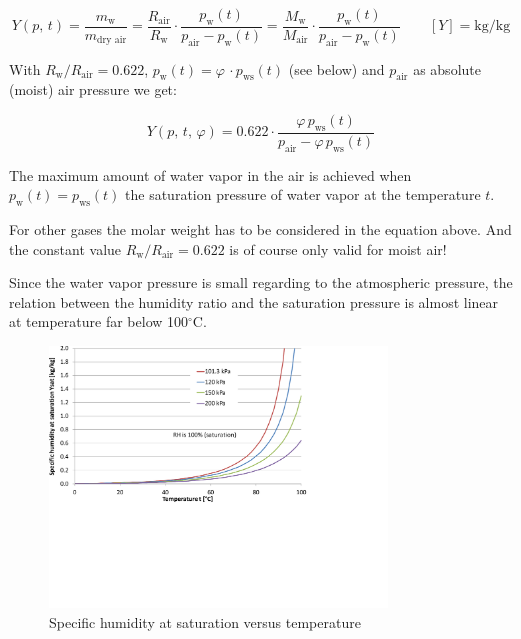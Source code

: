 \documentclass[11pt,a4paper,english,twoside]{scrreprt}
\newcommand{\gradC}{${}^\circ$C}      %
\begin{document}
\begin{equation}
  \label{eqn:Y}
  Y(p,\,t)=\frac{m_\text{w}}{m_\text{dry air}} =\frac{R_\text{air} }{R_\text{w} } \cdot \frac{p_\text{w}(t)}{p_\text{air} - p_\text{w}(t)} 
  =\frac{M_\text{w}}{M_\text{air}} \cdot \frac{p_\text{w}(t)}{p_\text{air} - p_\text{w}(t)}  \qquad [Y]= \si{\kilo\gram\per\kilo\gram}
\end{equation}

With $R_\text{w} / R_\text{air} = 0.622$, $p_\text{w}(t) = \varphi\,\cdot p_\text{ws}(t)$ (see below) and $p_\text{air}$ as absolute (moist) air pressure we get:

\begin{equation}
  \label{eqn:Yphi}
  Y(p,\,t,\,\varphi) = 0.622 \cdot \frac{\varphi\, p_\text{ws}(t) }{p_\text{air} - \varphi\, p_\text{ws}(t)}
\end{equation}


The maximum amount of water vapor in the air is achieved when $p_\text{w}(t) =p_\text{ws}(t)$ the saturation pressure of water vapor at the temperature $t$.

For other gases the molar weight has to be considered in the equation above. And the constant value $R_\text{w} / R_\text{air} = 0.622$ is of course only valid for moist air!

Since the water vapor pressure is small regarding to the atmospheric pressure, the relation between the humidity ratio and the saturation pressure is almost linear at temperature far below 100\gradC.

\begin{figure}
  \centering
  \includegraphics*[width=0.8\textwidth,angle=0]{FCF_Diag_Y.pdf}
  \caption[Specific humidity at saturation versus temperature]{Specific humidity at saturation versus temperature}
\end{figure}
\end{document}

